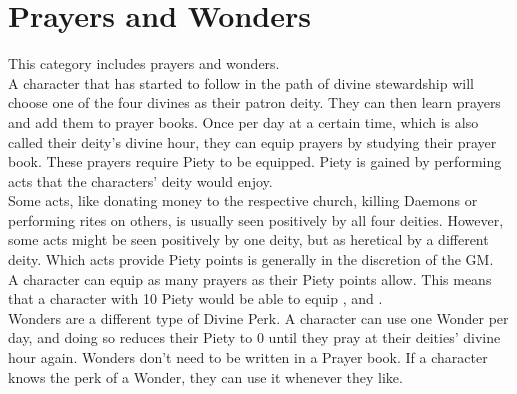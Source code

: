 \chapter{Prayers and Wonders}
This category includes prayers and wonders.\\
A character that has started to follow in the path of divine stewardship will choose one of the four divines as their patron deity. They can then learn prayers and add them to prayer books. Once per day at a certain time, which is also called their deity's divine hour, they can equip prayers by studying their prayer book. These prayers require Piety to be equipped. Piety is gained by performing acts that the characters' deity would enjoy.\\
Some acts, like donating money to the respective church, killing Daemons or performing rites on others, is usually seen positively by all four deities. However, some acts might be seen positively by one deity, but as heretical by a different deity. Which acts provide Piety points is generally in the discretion of the GM.\\
A character can equip as many prayers as their Piety points allow. This means that a character with 10 Piety would be able to equip ,  and .\\
Wonders are a different type of Divine Perk. A character can use one Wonder per day, and doing so reduces their Piety to 0 until they pray at their deities' divine hour again. Wonders don't need to be written in a Prayer book. If a character knows the perk of a Wonder, they can use it whenever they like.\\


	
	
	
	
	
	
	
	
	
	
	
	
	
	
	
	
	
	
	
	
	
	
	
